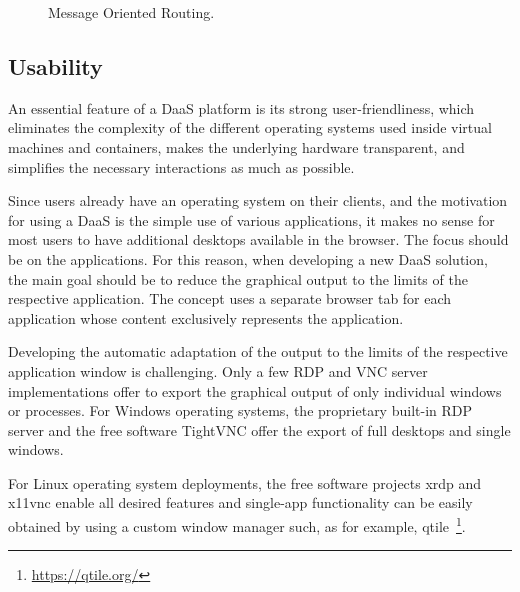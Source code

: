 \documentclass[runningheads]{llncs}
\begin{document}
\begin{figure}
\begin{adjustbox}{width=\textwidth}
	\end{adjustbox}
	\caption{Message Oriented Routing.}\label{message_routing}
\end{figure}

\subsection{Usability}
An essential feature of a DaaS platform is its strong user-friendliness,
which eliminates the complexity of the different operating systems
used inside virtual machines and containers,
makes the underlying hardware transparent,
and simplifies the necessary interactions as much as possible.

Since users already have an operating system on their clients,
and the motivation for using a DaaS is the simple use of various applications,
it makes no sense for most users to have additional desktops available in the browser.
The focus should be on the applications.
For this reason, when developing a new DaaS solution,
the main goal should be to reduce the graphical output
to the limits of the respective application.
The concept uses a separate browser tab for each application
whose content exclusively represents the application.

Developing the automatic adaptation of the output
to the limits of the respective application window is challenging.
Only a few RDP and VNC server implementations offer to export the graphical output
of only individual windows or processes.
For Windows operating systems, the proprietary built-in RDP server
and the free software TightVNC offer the export of full desktops and single windows.

For Linux operating system deployments,
the free software projects xrdp and x11vnc enable all desired features
and single-app functionality can be easily obtained
by using a custom window manager such,
as for example, qtile~\footnote{\url{https://qtile.org/}}.
\end{document}
